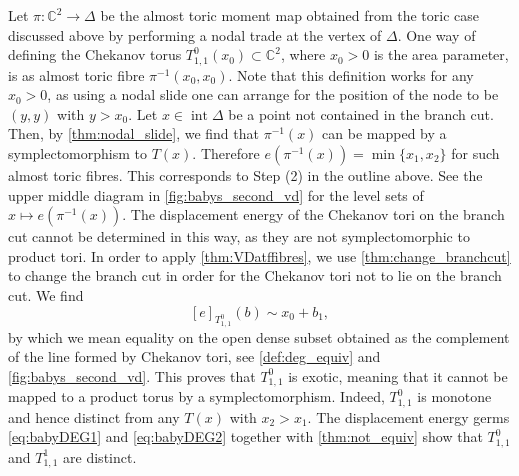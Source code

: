 \documentclass[12pt,a4paper,abstract=true,final]{scrartcl}
\DeclareMathOperator{\interior}{int}
\begin{document}
Let $\pi \colon \mathbb{C}^2 \rightarrow \Delta$ be the almost toric moment map obtained from the toric case discussed above by performing a nodal trade at the vertex of $\Delta$.
One way of defining the Chekanov torus $T^0_{1,1}(x_0) \subset \mathbb{C}^2$, where $x_0 > 0$ is the area parameter, is as almost toric fibre $\pi^{-1}(x_0,x_0)$.
Note that this definition works for any $x_0 >0$, as using a nodal slide one can arrange for the position of the node to be $(y,y)$ with $y > x_0$.
Let $x \in \interior\Delta$ be a point not contained in the branch cut.
Then, by \cref{thm:nodal_slide}, we find that $\pi^{-1}(x)$ can be mapped by a symplectomorphism to $T(x)$.
Therefore $e(\pi^{-1}(x)) = \min \{x_1,x_2\}$ for such almost toric fibres.
This corresponds to Step (2) in the outline above.
See the upper middle diagram in \cref{fig:babys_second_vd} for the level sets of $x \mapsto e(\pi^{-1}(x))$.
The displacement energy of the Chekanov tori on the branch cut cannot be determined in this way, as they are not symplectomorphic to product tori.
In order to apply \cref{thm:VDatffibres}, we use \cref{thm:change_branchcut} to change the branch cut in order for the Chekanov tori not to lie on the branch cut.
We find
\begin{equation}
    \label{eq:babyDEG2}
    [e]_{T^0_{1,1}}(b) \sim x_0 + b_1,
\end{equation}
by which we mean equality on the open dense subset obtained as the complement of the line formed by Chekanov tori, see \cref{def:deg_equiv} and \cref{fig:babys_second_vd}.
This proves that $T^0_{1,1}$ is exotic, meaning that it cannot be mapped to a product torus by a symplectomorphism.
Indeed, $T^0_{1,1}$ is monotone and hence distinct from any $T(x)$ with $x_2 > x_1$.
The displacement energy germs \eqref{eq:babyDEG1} and \eqref{eq:babyDEG2} together with \cref{thm:not_equiv} show that $T^0_{1,1}$ and $T^1_{1,1}$ are distinct. 
\end{document}
